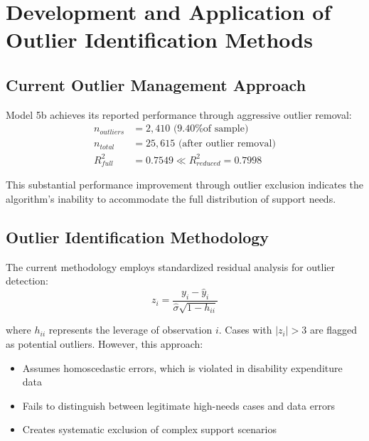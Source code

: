 \section{Development and Application of Outlier Identification Methods}

\subsection{Current Outlier Management Approach}

Model 5b achieves its reported performance through aggressive outlier removal:
\begin{align}
n_{outliers} &= 2,410 \text{ (9.40\% of sample)} \\
n_{total} &= 25,615 \text{ (after outlier removal)} \\
R^2_{full} &= 0.7549 \ll R^2_{reduced} = 0.7998
\end{align}

This substantial performance improvement through outlier exclusion indicates the algorithm's inability to accommodate the full distribution of support needs.

\subsection{Outlier Identification Methodology}

The current methodology employs standardized residual analysis for outlier detection:
\begin{equation}
z_i = \frac{y_i - \hat{y}_i}{\hat{\sigma} \sqrt{1 - h_{ii}}}
\end{equation}

where $h_{ii}$ represents the leverage of observation $i$. Cases with $|z_i| > 3$ are flagged as potential outliers. However, this approach:
\begin{itemize}
    \item Assumes homoscedastic errors, which is violated in disability expenditure data
    \item Fails to distinguish between legitimate high-needs cases and data errors
    \item Creates systematic exclusion of complex support scenarios
\end{itemize}

